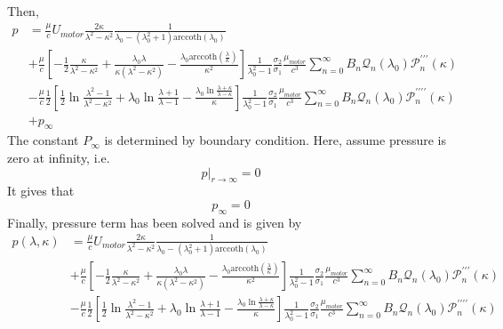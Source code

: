 \documentclass[fontsize=11pt, %
                             paper=a4, %
                             twoside, %
                             captions=tableheading,
                             index=totoc,
                             hyperref]{labbook}
\begin{document}
\begin{addmargin}[4cm]{0cm}
\begin{equation}
\end{equation}
Then,
\begin{equation}
\begin{aligned}
p&=\frac{\mu}{c}U_{motor}\frac{2\kappa}{\lambda^2-\kappa^2}\frac{1}{\lambda_0-(\lambda_0^2+1)\mathrm{arccoth}(\lambda_0)}\\
&+\frac{\mu}{c}
\left[-\frac{1}{2}\frac{\kappa}{\lambda^2-\kappa^2}+\frac{\lambda_0\lambda}{\kappa(\lambda^2-\kappa^2)}-\frac{\lambda_0\mathrm{arccoth}(\frac{\lambda}{\kappa})}{\kappa^2}\right]
\frac{1}{\lambda_0^2-1}\frac{\sigma_2}{\sigma_1}\frac{\mu_{motor}}{c^3}\sum_{n=0}^\infty B_n \mathscr{Q}_n(\lambda_0)\mathscr{P}_n^{\prime\prime\prime}(\kappa)\\
&-\frac{\mu}{c}\frac{1}{2}
\left[\frac{1}{2}\ln \frac{\lambda^2-1}{\lambda^2-\kappa^2}+\lambda_0\ln\frac{\lambda+1}{\lambda-1}-\frac{\lambda_0\ln\frac{\lambda+\kappa}{\lambda-\kappa}}{\kappa}\right]
\frac{1}{\lambda_0^2-1}\frac{\sigma_2}{\sigma_1}\frac{\mu_{motor}}{c^3}\sum_{n=0}^\infty B_n \mathscr{Q}_n(\lambda_0)\mathscr{P}_n^{\prime\prime\prime\prime}(\kappa)\\
&+p_\infty
\end{aligned}
\end{equation}
The constant $P_\infty$ is determined by boundary condition. Here, assume pressure is zero at infinity, i.e.
\begin{equation}
p|_{r\to\infty}=0
\end{equation}
It gives that
\begin{equation}
p_\infty=0
\end{equation}
Finally, pressure term has been solved and is given by
\begin{equation}
\begin{aligned}
p(\lambda,\kappa)&=\frac{\mu}{c}U_{motor}\frac{2\kappa}{\lambda^2-\kappa^2}\frac{1}{\lambda_0-(\lambda_0^2+1)\mathrm{arccoth}(\lambda_0)}\\
&+\frac{\mu}{c}
\left[-\frac{1}{2}\frac{\kappa}{\lambda^2-\kappa^2}+\frac{\lambda_0\lambda}{\kappa(\lambda^2-\kappa^2)}-\frac{\lambda_0\mathrm{arccoth}(\frac{\lambda}{\kappa})}{\kappa^2}\right]
\frac{1}{\lambda_0^2-1}\frac{\sigma_2}{\sigma_1}\frac{\mu_{motor}}{c^3}\sum_{n=0}^\infty B_n \mathscr{Q}_n(\lambda_0)\mathscr{P}_n^{\prime\prime\prime}(\kappa)\\
&-\frac{\mu}{c}\frac{1}{2}
\left[\frac{1}{2}\ln \frac{\lambda^2-1}{\lambda^2-\kappa^2}+\lambda_0\ln\frac{\lambda+1}{\lambda-1}-\frac{\lambda_0\ln\frac{\lambda+\kappa}{\lambda-\kappa}}{\kappa}\right]
\frac{1}{\lambda_0^2-1}\frac{\sigma_2}{\sigma_1}\frac{\mu_{motor}}{c^3}\sum_{n=0}^\infty B_n \mathscr{Q}_n(\lambda_0)\mathscr{P}_n^{\prime\prime\prime\prime}(\kappa)\\
\end{aligned}
\end{equation}

\end{addmargin}
\end{document}
